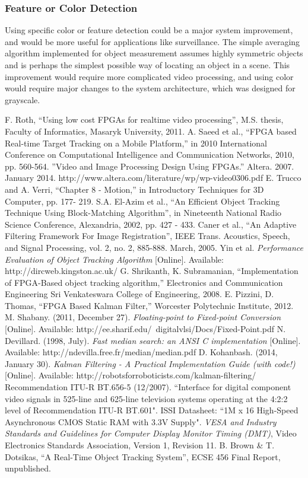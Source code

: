 \documentclass[11pt]{article} %
\begin{document}
\subsubsection{Feature or Color Detection}
Using specific color or feature detection could be a major system improvement, and would be more useful for applications like surveillance. The simple averaging algorithm implemented for object measurement assumes highly symmetric objects and is perhaps the simplest possible way of locating an object in a scene. This improvement would require more complicated video processing, and using color would require major changes to the system architecture, which was designed for grayscale.
\newpage
\begin{thebibliography}{11}
F. Roth, “Using low cost FPGAs for realtime video processing”, M.S. thesis, Faculty of Informatics, Masaryk University, 2011.
A. Saeed et al., “FPGA based Real-time Target Tracking on a Mobile Platform,” in 2010 International Conference on Computational Intelligence and Communication Networks, 2010, pp. 560-564.
”Video and Image Processing Design Using FPGAs.” Altera. 2007. January 2014. 
http://www.altera.com/literature/wp/wp-video0306.pdf  
E. Trucco and A. Verri, “Chapter 8 - Motion,” in Introductory Techniques for 3D Computer, pp. 177- 219.
S.A. El-Azim et al., “An Efficient Object Tracking Technique Using Block-Matching Algorithm”, in Nineteenth National Radio Science Conference, Alexandria, 2002, pp. 427 - 433.
Caner et al., “An Adaptive Filtering Framework For Image Registration”, IEEE Trans. Acoustics, Speech, and Signal Processing, vol. 2, no. 2, 885-888. March, 2005. 
Yin et al. \textit{Performance Evaluation of Object Tracking Algorithm} [Online]. Available: http://dircweb.kingston.ac.uk/ 
G. Shrikanth, K. Subramanian, “Implementation of FPGA-Based object tracking algorithm,” Electronics and Communication Engineering Sri Venkateswara College of Engineering, 2008.
E. Pizzini, D. Thomas, “FPGA Based Kalman Filter,” Worcester Polytechnic Institute, 2012.
M. Shabany. (2011, December 27). \textit{Floating-point to Fixed-point Conversion} [Online]. Available: http://ee.sharif.edu/~digitalvlsi/Docs/Fixed-Point.pdf
N. Devillard. (1998, July). \textit{Fast median search: an ANSI C implementation} [Online]. Available: http://ndevilla.free.fr/median/median.pdf
D. Kohanbash. (2014, January 30). \textit{Kalman Filtering - A Practical Implementation Guide (with code!)} [Online]. Available: http://robotsforroboticists.com/kalman-filtering/
 Recommendation ITU-R BT.656-5 (12/2007). “Interface for digital component video signals in 525-line and 625-line television systems operating at the 4:2:2 level of Recommendation ITU-R BT.601". 
 ISSI Datasheet: “1M x 16 High-Speed Asynchronous CMOS Static RAM with 3.3V Supply".
 \textit{VESA and Industry Standards and Guidelines for Computer Display Monitor Timing (DMT)}, Video Electronics Standards Association, Version 1, Revision 11.
 B. Brown \& T. Dotsikas, “A Real-Time Object Tracking System”, ECSE 456 Final Report, unpublished.
\end{thebibliography}
\newpage
\appendix
\appendixpage
\end{document}
